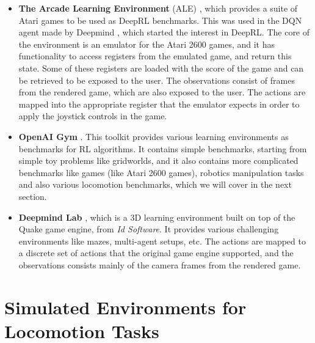 \begin{itemize}

    \item \textbf{The Arcade Learning Environment} (ALE) \citep{BellemareALE}, which provides a suite
           of Atari games to be used as DeepRL benchmarks. This was used in the DQN
           agent made by Deepmind \citep{DQNAtari}, which started the interest in DeepRL.
           The core of the environment is an emulator for the Atari 2600 games, and
           it has functionality to access registers from the emulated game, and return
           this state. Some of these registers are loaded with the score of the game
           and can be retrieved to be exposed to the user. The observations consist
           of frames from the rendered game, which are also exposed to the user. The actions
           are mapped into the appropriate register that the emulator expects in order
           to apply the joystick controls in the game.

           \figALEgames

    \item \textbf{OpenAI Gym} \citep{Gym}. This toolkit provides various learning environments
           as benchmarks for RL algorithms. It contains simple benchmarks, starting from simple
           toy problems like gridworlds, and it also contains more complicated benchmarks like
           games (like Atari 2600 games), robotics manipulation tasks and also various
           locomotion benchmarks, which we will cover in the next section.

           \figOpenAIEnvs

    \item \textbf{Deepmind Lab} \citep{DeepmindLab}, which is a 3D learning environment built on top
           of the Quake game engine, from \textit{Id Software}. It provides various challenging
           environments like mazes, multi-agent setups, etc. The actions are mapped to a discrete
           set of actions that the original game engine supported, and the observations consists
           mainly of the camera frames from the rendered game.

           \figDeepmindLabEnvs

\end{itemize}

\section{Simulated Environments for Locomotion Tasks}

